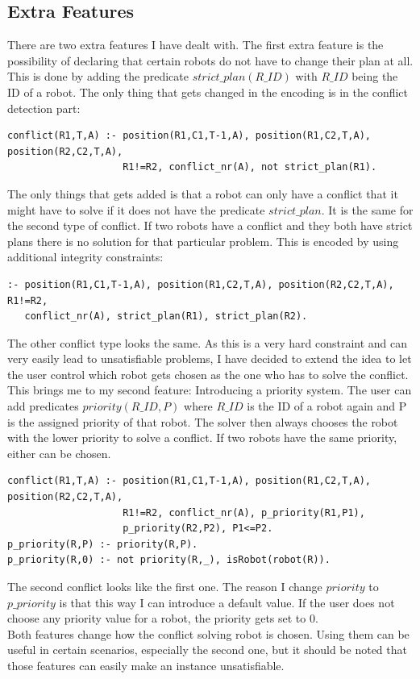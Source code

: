 \documentclass[runningheads]{llncs}
\begin{document}
\subsection{Extra Features}
There are two extra features I have dealt with. The first extra feature is the possibility of declaring that certain robots do not have to change their plan at all.
This is done by adding the predicate $strict\_plan(R\_ID)$ with $R\_ID$ being the ID of a robot. The only thing that gets changed in the encoding is in the conflict detection part:
\begin{verbatim}
conflict(R1,T,A) :- position(R1,C1,T-1,A), position(R1,C2,T,A), position(R2,C2,T,A), 
                    R1!=R2, conflict_nr(A), not strict_plan(R1).
\end{verbatim}
The only things that gets added is that a robot can only have a conflict that it might have to solve if it does not have the predicate $strict\_plan$. It is
the same for the second type of conflict. If two robots have a conflict and they both have strict plans there is no solution for that particular problem. 
This is encoded by using additional integrity constraints:
\begin{verbatim}
:- position(R1,C1,T-1,A), position(R1,C2,T,A), position(R2,C2,T,A), R1!=R2, 
   conflict_nr(A), strict_plan(R1), strict_plan(R2).
\end{verbatim}
The other conflict type looks the same. As this is a very hard constraint and can very easily lead to unsatisfiable problems, I have decided to extend the idea
to let the user control which robot gets chosen as the one who has to solve the conflict. This brings me to my second feature: Introducing a priority system.
The user can add predicates $priority(R\_ID, P)$ where $R\_ID$ is the ID of a robot again and P is the assigned priority of that robot. 
The solver then always chooses the robot with the lower priority to solve a conflict. If two robots have the same priority, either can be chosen. 
\begin{verbatim}
conflict(R1,T,A) :- position(R1,C1,T-1,A), position(R1,C2,T,A), position(R2,C2,T,A), 
                    R1!=R2, conflict_nr(A), p_priority(R1,P1), 
                    p_priority(R2,P2), P1<=P2.
p_priority(R,P) :- priority(R,P).
p_priority(R,0) :- not priority(R,_), isRobot(robot(R)).						
\end{verbatim}
The second conflict looks like the first one. The reason I change $priority$ to $p\_priority$ is that this way I can introduce a default value. If the user does not choose any priority value for a robot,
the priority gets set to 0. \\
Both features change how the conflict solving robot is chosen. Using them can be useful in certain scenarios, especially the second one, but it should be noted that those features can
easily make an instance unsatisfiable.
\end{document}

